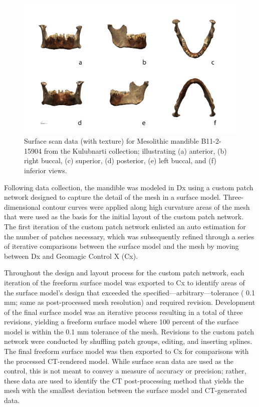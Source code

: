 \documentclass[review]{elsarticle}
\begin{document}
\begin{figure}[ht]\centering
\includegraphics[width=\linewidth]{Fig1}
\caption{Surface scan data (with texture) for Mesolithic mandible B11-2-15904 from the Kulubnarti collection; illustrating (a) anterior, (b) right buccal, (c) superior, (d) posterior, (e) left buccal, and (f) inferior views.}
\label{fig:Fig2}
\end{figure}

Following data collection, the mandible was modeled in Dx using a custom patch network designed to capture the detail of the mesh in a surface model. Three-dimensional contour curves were applied along high curvature areas of the mesh that were used as the basis for the initial layout of the custom patch network. The first iteration of the custom patch network enlisted an auto estimation for the number of patches necessary, which was subsequently refined through a series of iterative comparisons between the surface model and the mesh by moving between Dx and Geomagic Control X (Cx).

Throughout the design and layout process for the custom patch network, each iteration of the freeform surface model was exported to Cx to identify areas of the surface model’s design that exceeded the specified---arbitrary---tolerance ( 0.1 mm; same as post-processed mesh resolution) and required revision. Development of the final surface model was an iterative process resulting in a total of three revisions, yielding a freeform surface model where 100 percent of the surface model is within the  0.1 mm tolerance of the mesh. Revisions to the custom patch network were conducted by shuffling patch groups, editing, and inserting splines. The final freeform surface model was then exported to Cx for comparisons with the processed CT-rendered model. While surface scan data are used as the control, this is not meant to convey a measure of accuracy or precision; rather, these data are used to identify the CT post-processing method that yields the mesh with the smallest deviation between the surface model and CT-generated data.
\end{document}
